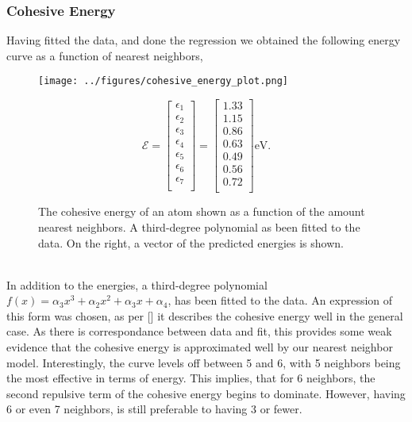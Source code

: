 \documentclass[working, oneside]{../../../Preambles/marginclass}
\begin{document}
\subsubsection*{Cohesive Energy}
Having fitted the data, and done the regression we obtained the following energy curve as a function of nearest neighbors, \\
\begin{figure}[htpb]
    \centering
    \begin{minipage}{0.5\textwidth}
        \texttt{[image: ../figures/cohesive\_energy\_plot.png]}
        \label{fig:}
    \end{minipage}\hfill
    \begin{minipage}{0.5\textwidth}
        \centering
        \[
            \mathcal{E} =
        \begin{bmatrix}
            \epsilon_1 \\
            \epsilon_2 \\
            \epsilon_3 \\
            \epsilon_4 \\
            \epsilon_5 \\
            \epsilon_6 \\
            \epsilon_7 \\
        \end{bmatrix}
        = 
        \begin{bmatrix}
            1.33 \\
            1.15 \\
            0.86 \\
            0.63 \\
            0.49 \\
            0.56 \\
            0.72 \\
        \end{bmatrix}
        \text{eV}
        .\] 
    \end{minipage}
    \caption{The cohesive energy of an atom shown as a function of the amount nearest neighbors. A third-degree polynomial as been fitted to the data. On the right, a vector of the predicted energies is shown.}
\end{figure}
\\
In addition to the energies, a third-degree polynomial $f\left( x \right) = \alpha_3 x^{3} + \alpha_2 x^2 + \alpha_3 x + \alpha_4$, has been fitted to the data. An expression of this form was chosen, as per [] it describes the cohesive energy well in the general case. As there is correspondance between data and fit, this provides some weak evidence that the cohesive energy is approximated well by our nearest neighbor model. Interestingly, the curve levels off between 5 and 6, with 5 neighbors being the most effective in terms of energy. This implies, that for 6 neighbors, the second repulsive term of the cohesive energy begins to dominate. However, having 6 or even 7 neighbors, is still preferable to having 3 or fewer.
\end{document}
